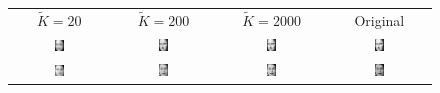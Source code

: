 \begin{figure}[ht]
	\centering
	\begin{tabular}{cccc}
		$\tilde K=20$ & $\tilde K=200$ & $\tilde K=2000$ & Original \\
		\includegraphics[width=0.1\textwidth]{images/compression/mona_lisa_20} &
		\includegraphics[width=0.1\textwidth]{images/compression/mona_lisa_200} &
		\includegraphics[width=0.1\textwidth]{images/compression/mona_lisa_2000} & \includegraphics[width=0.1\textwidth]{images/compression/mona_lisa} \\
		\includegraphics[width=0.1\textwidth]{images/compression/queen_elizabeth_20} &
		\includegraphics[width=0.1\textwidth]{images/compression/queen_elizabeth_200} &
		\includegraphics[width=0.1\textwidth]{images/compression/queen_elizabeth_2000} & \includegraphics[width=0.1\textwidth]{images/compression/queen_elizabeth} \\

\end{tabular}
\end{figure}
